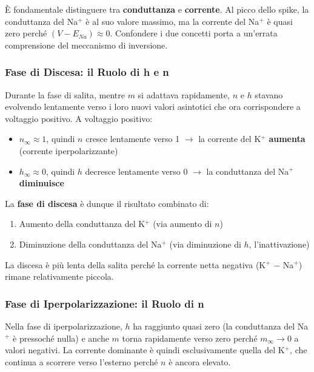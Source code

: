 \begin{tcolorbox}[colback=gray!5, colframe=gray!40, arc=2mm, boxrule=0.5pt]
È fondamentale distinguere tra \textbf{conduttanza} e \textbf{corrente}. Al picco dello spike, la conduttanza del Na$^+$ è al suo valore massimo, ma la corrente del Na$^+$ è quasi zero perché $(V - E_{Na}) \approx 0$. Confondere i due concetti porta a un'errata comprensione del meccanismo di inversione.
\end{tcolorbox}

\subsubsection{Fase di Discesa: il Ruolo di h e n}

Durante la fase di salita, mentre $m$ si adattava rapidamente, $n$ e $h$ stavano evolvendo lentamente verso i loro nuovi valori asintotici che ora corrispondere a voltaggio positivo. A voltaggio positivo:

\begin{itemize}
    \item $n_\infty \approx 1$, quindi $n$ cresce lentamente verso 1 $\rightarrow$ la corrente del K$^+$ \textbf{aumenta} (corrente iperpolarizzante)
    \item $h_\infty \approx 0$, quindi $h$ decresce lentamente verso 0 $\rightarrow$ la conduttanza del Na$^+$ \textbf{diminuisce}
\end{itemize}

La \textbf{fase di discesa} è dunque il risultato combinato di:
\begin{enumerate}
    \item Aumento della conduttanza del K$^+$ (via aumento di $n$)
    \item Diminuzione della conduttanza del Na$^+$ (via diminuzione di $h$, l'inattivazione)
\end{enumerate}

La discesa è più lenta della salita perché la corrente netta negativa (K$^+$ $-$ Na$^+$) rimane relativamente piccola.

\subsubsection{Fase di Iperpolarizzazione: il Ruolo di n}

Nella fase di iperpolarizzazione, $h$ ha raggiunto quasi zero (la conduttanza del Na$^+$ è pressoché nulla) e anche $m$ torna rapidamente verso zero perché $m_\infty \to 0$ a valori negativi. La corrente dominante è quindi esclusivamente quella del K$^+$, che continua a scorrere verso l'esterno perché $n$ è ancora elevato.

